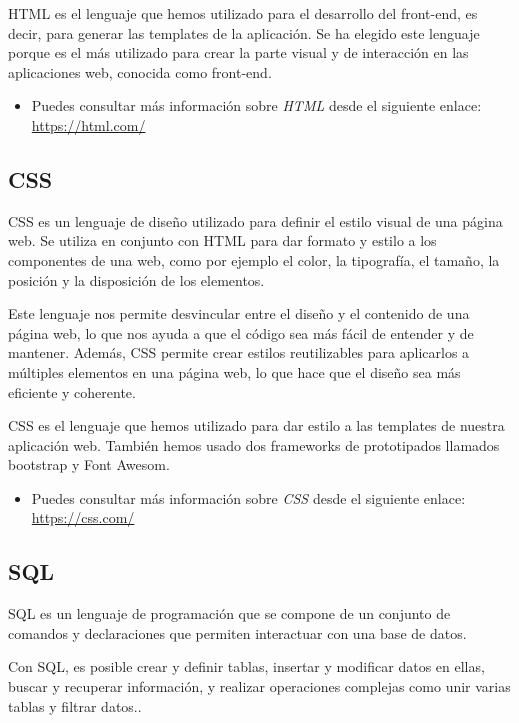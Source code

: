 HTML es el lenguaje que hemos utilizado para el desarrollo del front-end, es decir, para generar las templates de la aplicación. Se ha elegido este lenguaje porque es el más utilizado para crear la parte visual y de interacción en las aplicaciones web, conocida como front-end.

\begin{itemize}
    \item Puedes consultar más información sobre  \textit{HTML}  desde el siguiente enlace: \url{https://html.com/}
\end{itemize}

\subsection{CSS} \label{CSS}

CSS es un lenguaje de diseño utilizado para definir el estilo visual de una página web. Se utiliza en conjunto con HTML para dar formato y estilo a los componentes de una web, como por ejemplo el color, la tipografía, el tamaño, la posición y la disposición de los elementos.\cite{marcado}

Este lenguaje nos permite desvincular entre el diseño y el contenido de una página web, lo que nos ayuda a que el código sea más fácil de entender y de mantener. Además, CSS permite crear estilos reutilizables para aplicarlos a múltiples elementos en una página web, lo que hace que el diseño sea más eficiente y coherente.

CSS es el lenguaje que hemos utilizado para dar estilo a las templates de nuestra aplicación web. También hemos usado dos frameworks de prototipados llamados bootstrap y Font Awesom.

\begin{itemize}
    \item Puedes consultar más información sobre   \textit{CSS}  desde el siguiente enlace: \url{https://css.com/}
\end{itemize}


\subsection{SQL} \label{SQL}

SQL es un lenguaje de programación que se compone de un conjunto de comandos y declaraciones que permiten interactuar con una base de datos\cite{consultas}.

Con SQL, es posible crear y definir tablas, insertar y modificar datos en ellas, buscar y recuperar información, y realizar operaciones complejas como unir varias tablas y filtrar datos.\cite{operaciones}.

